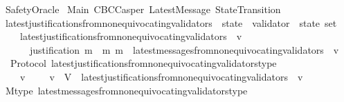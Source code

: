 %
\begin{isabellebody}%
%
%
\isadelimtheory
%
\endisadelimtheory
%
\isatagtheory
{}\isamarkupfalse%
\ SafetyOracle\isanewline
\isanewline
{}\ Main\ CBCCasper\ LatestMessage\ StateTransition\isanewline
\isanewline
{}%
\endisatagtheory
{\isafoldtheory}%
%
\isadelimtheory
\isanewline
%
\endisadelimtheory
\isanewline
\isanewline
\isanewline
\isanewline
\isanewline
\isanewline
\isanewline
\isanewline
\isanewline
\isanewline
\isanewline
\isanewline
\isanewline
\isanewline
\isanewline
\isanewline
{}\isamarkupfalse%
\ latest{\isacharunderscore}justifications{\isacharunderscore}from{\isacharunderscore}non{\isacharunderscore}equivocating{\isacharunderscore}validators\ {\isacharcolon}{\isacharcolon}\ {\isachardoublequoteopen}state\ {\isasymRightarrow}\ validator\ {\isasymRightarrow}\ state\ set{\isachardoublequoteclose}\isanewline
\ \ \isanewline
\ \ \ \ {\isachardoublequoteopen}latest{\isacharunderscore}justifications{\isacharunderscore}from{\isacharunderscore}non{\isacharunderscore}equivocating{\isacharunderscore}validators\ {\isasymsigma}\ v\ {\isacharequal}\ \isanewline
\ \ \ \ \ \ {\isacharbraceleft}justification\ m\ {\isacharbar}\ m{\isachardot}\ m\ {\isasymin}\ latest{\isacharunderscore}messages{\isacharunderscore}from{\isacharunderscore}non{\isacharunderscore}equivocating{\isacharunderscore}validators\ {\isasymsigma}\ v{\isacharbraceright}{\isachardoublequoteclose}\isanewline
\isanewline
{}\isamarkupfalse%
\ {\isacharparenleft}\ Protocol{\isacharparenright}\ latest{\isacharunderscore}justifications{\isacharunderscore}from{\isacharunderscore}non{\isacharunderscore}equivocating{\isacharunderscore}validators{\isacharunderscore}type\ {\isacharcolon}\isanewline
\ \ {\isachardoublequoteopen}{\isasymforall}\ {\isasymsigma}\ v{\isachardot}\ {\isasymsigma}\ {\isasymin}\ {\isasymSigma}\ {\isasymand}\ v\ {\isasymin}\ V\ {\isasymlongrightarrow}\ latest{\isacharunderscore}justifications{\isacharunderscore}from{\isacharunderscore}non{\isacharunderscore}equivocating{\isacharunderscore}validators\ {\isasymsigma}\ v\ {\isasymsubseteq}\ {\isasymSigma}{\isachardoublequoteclose}\isanewline
%
\isadelimproof
\ \ %
\endisadelimproof
%
\isatagproof
{}\isamarkupfalse%
\ M{\isacharunderscore}type\ latest{\isacharunderscore}messages{\isacharunderscore}from{\isacharunderscore}non{\isacharunderscore}equivocating{\isacharunderscore}validators{\isacharunderscore}type\ \isamarkupfalse%

\end{isabellebody}
